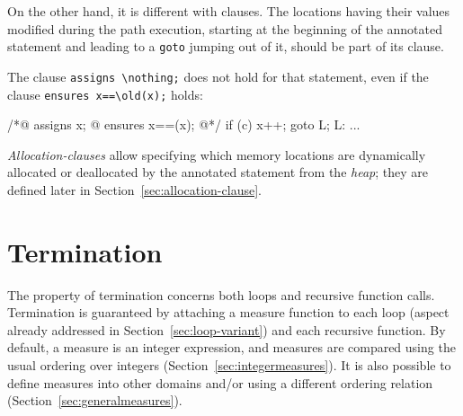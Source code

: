 On the other hand, it is different with \assigns{} clauses.
The locations having their values modified during the path execution, starting
at the beginning of the annotated statement and leading
to a \lstinline|goto| jumping out of it, should be part of its 
\assigns clause.

\begin{example} The clause \lstinline|assigns \nothing;| does not hold for that statement,
even if the clause \lstinline|ensures x==\old(x);| holds: 
\begin{listing}{1}
/*@ assigns x;
  @ ensures x==\old(x);
  @*/
  if (c) {
    x++;
    goto L;
  }
L: ...
\end{listing}
\end{example}

\textsl{Allocation-clauses} allow specifying which memory locations 
are dynamically allocated or deallocated by the annotated statement from the \textsl{heap}; 
they are defined later in Section~\ref{sec:allocation-clause}.


\section{Termination}
\label{sec:termination}
The property of termination concerns both loops and recursive function
calls.
Termination is guaranteed by attaching a measure function to each loop
(aspect already addressed in Section~\ref{sec:loop-variant}) 
and each recursive function.
By default, a measure is an
integer expression, and measures are compared using the usual ordering
over integers (Section~\ref{sec:integermeasures}). It is also possible
to define
measures into other domains and/or using a different ordering relation
(Section~\ref{sec:generalmeasures}).

